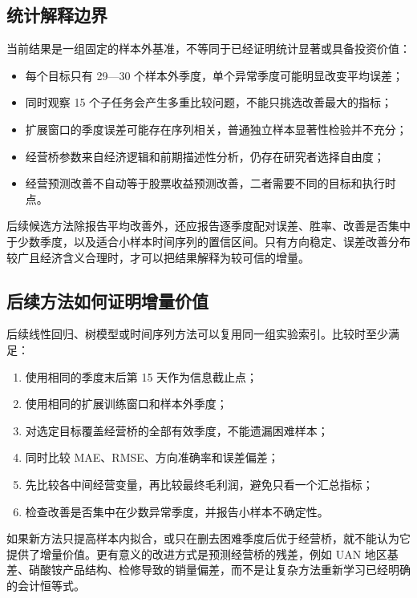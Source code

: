 \documentclass[11pt,a4paper]{ctexart}
\begin{document}
\subsection{统计解释边界}

当前结果是一组固定的样本外基准，不等同于已经证明统计显著或具备投资价值：

\begin{itemize}
  \item 每个目标只有 29---30 个样本外季度，单个异常季度可能明显改变平均误差；
  \item 同时观察 15 个子任务会产生多重比较问题，不能只挑选改善最大的指标；
  \item 扩展窗口的季度误差可能存在序列相关，普通独立样本显著性检验并不充分；
  \item 经营桥参数来自经济逻辑和前期描述性分析，仍存在研究者选择自由度；
  \item 经营预测改善不自动等于股票收益预测改善，二者需要不同的目标和执行时点。
\end{itemize}

后续候选方法除报告平均改善外，还应报告逐季度配对误差、胜率、改善是否集中于少数季度，以及适合小样本时间序列的置信区间。只有方向稳定、误差改善分布较广且经济含义合理时，才可以把结果解释为较可信的增量。

\subsection{后续方法如何证明增量价值}

后续线性回归、树模型或时间序列方法可以复用同一组实验索引。比较时至少满足：

\begin{enumerate}
  \item 使用相同的季度末后第 15 天作为信息截止点；
  \item 使用相同的扩展训练窗口和样本外季度；
  \item 对选定目标覆盖经营桥的全部有效季度，不能遗漏困难样本；
  \item 同时比较 MAE、RMSE、方向准确率和误差偏差；
  \item 先比较各中间经营变量，再比较最终毛利润，避免只看一个汇总指标；
  \item 检查改善是否集中在少数异常季度，并报告小样本不确定性。
\end{enumerate}

如果新方法只提高样本内拟合，或只在删去困难季度后优于经营桥，就不能认为它提供了增量价值。更有意义的改进方式是预测经营桥的残差，例如 UAN 地区基差、硝酸铵产品结构、检修导致的销量偏差，而不是让复杂方法重新学习已经明确的会计恒等式。
\end{document}
